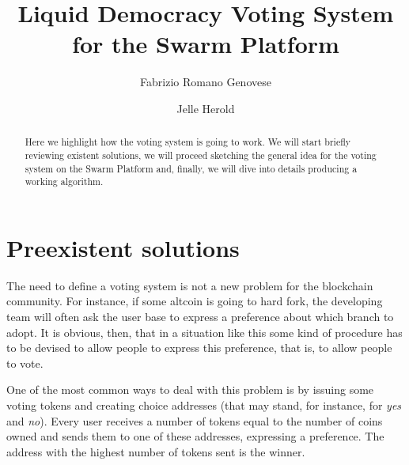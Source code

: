 \documentclass[submission, copyright,creativecommons,sharealike,noncommercial]{eptcs}
\title{Liquid Democracy Voting System for the Swarm Platform}
\author{Fabrizio Romano Genovese
	\institute{Swarm Team}
	\institute{Quantum Group \\ University of Oxford}
	\email{fabrizio@swarm.fund}
\and
Jelle Herold
	\institute{Swarm Team}
	\email{jelle@swarm.fund}
}
\begin{document}
%	
	
	\maketitle

	\begin{abstract}
		Here we highlight how the voting system is going to work. We will start briefly reviewing existent solutions, we will proceed sketching the general idea for the voting system on the Swarm Platform and, finally, we will dive into details producing a working algorithm.
	\end{abstract}

\section{Preexistent solutions}\label{sec:Preexistent solutions}
	The need to define a voting system is not a new problem for the blockchain community. For instance, if some altcoin is going to hard fork, the developing team will often ask the user base to express a preference about which branch to adopt. It is obvious, then, that in a situation like this some kind of procedure has to be devised to allow people to express this preference, that is, to allow people to vote.
	
	One of the most common ways to deal with this problem is by issuing some voting tokens and creating choice addresses (that may stand, for instance, for \emph{yes} and \emph{no}). Every user receives a number of tokens equal to the number of coins owned and sends them to one of these addresses, expressing a preference. The address with the highest number of tokens sent is the winner.
	
\end{document}
